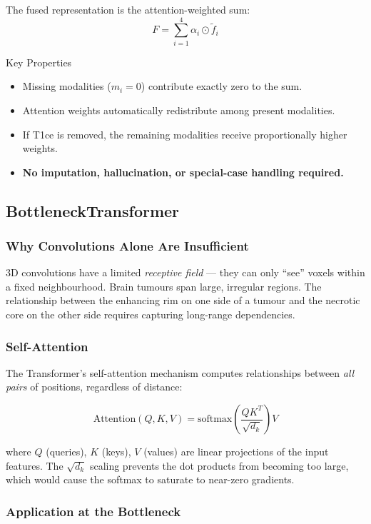 \documentclass[12pt,a4paper]{article}
\begin{document}
The fused representation is the attention-weighted sum:
\[
F = \sum_{i=1}^{4} \alpha_i \odot \tilde{f}_i
\]

\begin{resultbox}{Key Properties}
\begin{itemize}[noitemsep]
  \item Missing modalities ($m_i = 0$) contribute exactly zero to the sum.
  \item Attention weights automatically redistribute among present modalities.
  \item If T1ce is removed, the remaining modalities receive proportionally higher weights.
  \item \textbf{No imputation, hallucination, or special-case handling required.}
\end{itemize}
\end{resultbox}

\subsection{BottleneckTransformer}

\subsubsection{Why Convolutions Alone Are Insufficient}

3D convolutions have a limited \emph{receptive field} --- they can only ``see'' voxels within a fixed neighbourhood. Brain tumours span large, irregular regions. The relationship between the enhancing rim on one side of a tumour and the necrotic core on the other side requires capturing long-range dependencies.

\subsubsection{Self-Attention}

The Transformer's self-attention mechanism computes relationships between \emph{all pairs} of positions, regardless of distance:

\[
\text{Attention}(Q, K, V) = \text{softmax}\!\left(\frac{QK^T}{\sqrt{d_k}}\right) V
\]

where $Q$ (queries), $K$ (keys), $V$ (values) are linear projections of the input features. The $\sqrt{d_k}$ scaling prevents the dot products from becoming too large, which would cause the softmax to saturate to near-zero gradients.

\subsubsection{Application at the Bottleneck}
\end{document}

